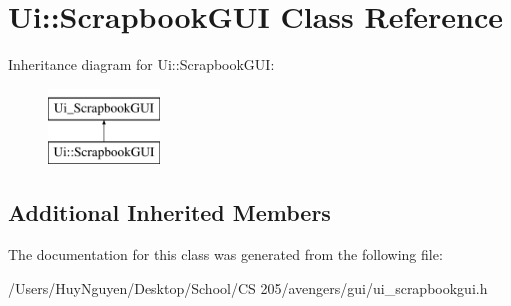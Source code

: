 \hypertarget{classUi_1_1ScrapbookGUI}{}\section{Ui\+:\+:Scrapbook\+G\+UI Class Reference}
\label{classUi_1_1ScrapbookGUI}
Inheritance diagram for Ui\+:\+:Scrapbook\+G\+UI\+:\begin{figure}[H]
\begin{center}
\leavevmode
\includegraphics[height=2.000000cm]{classUi_1_1ScrapbookGUI}
\end{center}
\end{figure}
\subsection*{Additional Inherited Members}


The documentation for this class was generated from the following file\+:\begin{DoxyCompactItemize}
\item 
/\+Users/\+Huy\+Nguyen/\+Desktop/\+School/\+C\+S 205/avengers/gui/ui\+\_\+scrapbookgui.\+h\end{DoxyCompactItemize}
